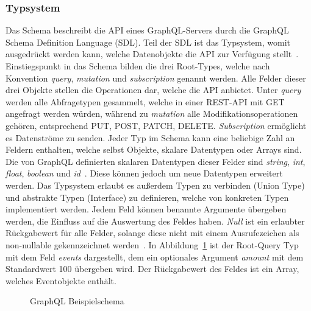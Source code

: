 \subsubsection{Typsystem}
Das Schema beschreibt die API eines GraphQL-Servers durch die GraphQL Schema Definition Language (SDL).
Teil der SDL ist das Typsystem, womit ausgedrückt werden kann, welche Datenobjekte die API zur Verfügung stellt~\cite[vgl.][]{GraphQL-spec-github}.
Einstiegspunkt in das Schema bilden die drei Root-Types, welche nach Konvention \emph{query}, \emph{mutation} und \emph{subscription} genannt werden.
Alle Felder dieser drei Objekte stellen die Operationen dar, welche die API anbietet.
Unter \emph{query} werden alle Abfragetypen gesammelt, welche in einer REST-API mit GET angefragt werden würden, während zu \emph{mutation} alle Modifikationsoperationen gehören, entsprechend PUT, POST, PATCH, DELETE.
\emph{Subscription} ermöglicht es Datenströme zu senden.
Jeder Typ im Schema kann eine beliebige Zahl an Feldern enthalten, welche selbst Objekte, skalare Datentypen oder Arrays sind.
Die von GraphQL definierten skalaren Datentypen dieser Felder sind \emph{string}, \emph{int}, \emph{float}, \emph{boolean} und \emph{id}~\cite[vgl.][]{GraphQL-Spec}.
Diese können jedoch um neue Datentypen erweitert werden.
Das Typsystem erlaubt es außerdem Typen zu verbinden (Union Type) und abstrakte Typen (Interface) zu definieren, welche von konkreten Typen implementiert werden.
Jedem Feld können benannte Argumente übergeben werden, die Einfluss auf die Auswertung des Feldes haben.
\emph{Null} ist ein erlaubter Rückgabewert für alle Felder, solange diese nicht mit einem Ausrufezeichen als non-nullable gekennzeichnet werden~\cite[vgl.][]{GraphQL-Spec}.
In Abbildung~\ref{code:gql-schema} ist der Root-Query Typ mit dem Feld \emph{events} dargestellt, dem ein optionales Argument \emph{amount} mit dem Standardwert 100 übergeben wird.
Der Rückgabewert des Feldes ist ein Array, welches Eventobjekte enthält.
\begin{figure}[h]
  \centering
  \caption{GraphQL Beispielschema}\label{code:gql-schema}
\end{figure}

